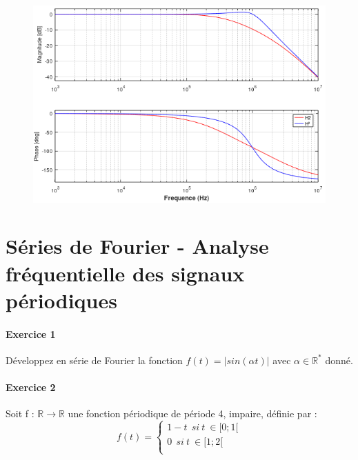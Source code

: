 \documentclass[11pt]{report}
\begin{document}
	\begin{figure}[h!]
		\centering
		\includegraphics[scale=0.6]{images/Effet_cascade_filtre_RC.png} 
	\end{figure}
	
	 
	
	
	
	
	
	
	
	\vspace{1\baselineskip}
	
	
	\newpage
	
	\chapter{Séries de Fourier - Analyse fréquentielle des signaux périodiques}
	
	\subsubsection{Exercice 1}
	Développez en série de Fourier la fonction $f(t)=|sin(\alpha t)|$ avec $\alpha \in \mathbb{R^{*}}$ donné.\\
	
	\subsubsection{Exercice 2}
	Soit f : $\mathbb{R} \rightarrow \mathbb{R}$ une fonction périodique de période 4, impaire, définie par :
	\begin{equation*}
	f(t)=\left \{
	\begin{array}{l}
	1-t~~si~t~\in[0;1[ \\
	0~~si~t~\in[1;2[ \\
	\end{array}
	\right .
	\end{equation*}
	
\end{document}
